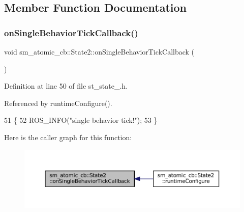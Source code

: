 \subsection{Member Function Documentation}
\mbox{\label{structsm__atomic__cb_1_1State2_a4187898b6f6e82dd8f12770856fb8e24}} 
\subsubsection{\texorpdfstring{on\+Single\+Behavior\+Tick\+Callback()}{onSingleBehaviorTickCallback()}}
{\footnotesize\ttfamily void sm\+\_\+atomic\+\_\+cb\+::\+State2\+::on\+Single\+Behavior\+Tick\+Callback (\begin{DoxyParamCaption}{ }\end{DoxyParamCaption})\hspace{0.3cm}{\ttfamily [inline]}}



Definition at line 50 of file st\+\_\+state\+\_.\+h.



Referenced by runtime\+Configure().


\begin{DoxyCode}
51     \{
52         ROS\_INFO(\textcolor{stringliteral}{"single behavior tick!"});
53     \}
\end{DoxyCode}
Here is the caller graph for this function\+:
\nopagebreak
\begin{figure}[H]
\begin{center}
\leavevmode
\includegraphics[width=350pt]{structsm__atomic__cb_1_1State2_a4187898b6f6e82dd8f12770856fb8e24_icgraph}
\end{center}
\end{figure}
\mbox{\label{structsm__atomic__cb_1_1State2_a9367ee51725a8f2e8cdbf7d922cf9108}} 
